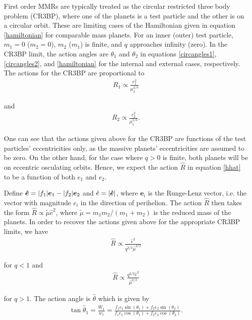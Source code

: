 \documentclass[usenatbib]{mnras}
\renewcommand{\v}[1]{\boldsymbol{ #1 }}
\DeclarePairedDelimiter{\abs}{|}{|}
\begin{document}
First order MMRs are typically treated as the circular restricted
three body problem (CR3BP), where one of the planets is a test
particle and the other is on a circular orbit. These are limiting
cases of the Hamiltonian given in equation \eqref{hamiltonian} for
comparable mass planets. For an inner (outer) test particle, \(m_1=0\)
(\(m_2=0\)), \(m_2\) (\(m_1\)) is finite, and \(q\) approaches infinity
(zero).  In the CR3BP limit, the action angles are \(\theta_1\) and
\(\theta_2\) in equations \eqref{circangles1}, \eqref{circangles2}, and
\eqref{hamiltonian} for the internal and external cases, respectively.
The actions for the CR3BP are proportional to
\begin{align}
\label{eq:R2limit}
  R_1  \propto \frac{e_1^2}{\mu_2^{2/3}}
\end{align}

\noindent 
and
\begin{align}
\label{eq:R1limit}
  R_2  \propto  \frac{e_2^2}{\mu_1^{2/3}} .
\end{align}

One can see that the actions given above for the CR3BP are functions
of the test particles' eccentricities only, as the massive planets'
eccentricities are assumed to be zero.  On the other hand, for the
case where \(q>0\) is finite, both planets will be on eccentric
osculating orbits.
Hence, we expect the action \(\hat R\) in equation \eqref{hhat}
to be a function of both \(e_1\) and \(e_2\).

Define \(\v{\hat e} = \abs{f_1}\v e_1 - \abs{f_2}\v e_2\) and \(\hat e =
\abs{\v{\hat e}}\), where \(\v e_i\) is the Runge-Lenz vector, i.e. the
vector with magnitude \(e_i\) in the direction of perihelion.  The
action \(\hat R\) then takes the form \(\hat R \propto \tilde \mu
\hat e^2\), where \(\tilde\mu = m_1m_2/(m_1+m_2)\) is the reduced mass of the
planets. In order to recover the actions given above for the
appropriate CR3BP limits, we have
\begin{align}
\label{eq:R1hatlimit}
  \hat R \propto \frac{\hat e^2}{q^{2/3}\hat\mu^{2/3}}
\end{align}

\noindent 
for \(q < 1\)
and
\begin{align}
\label{eq:R2hatlimit}
  \hat R \propto \frac{q^{2/3}\hat e^2}{\hat\mu^{2/3}}
\end{align}

\noindent
for \(q>1\).
The action angle is \(\hat\theta\) which is given by
\begin{align}
\label{hattheta}
  \tan\hat{\theta}_1 = \frac{W_1}{w_1} = \frac{f_1 e_1\sin(\theta_1)
  + f_2e_2\sin(\theta_2)}{f_1e_1\cos(\theta_1) + f_2e_2\cos(\theta_2)}.
\end{align}
\end{document}
